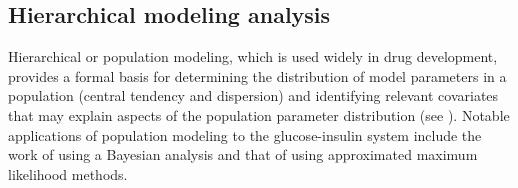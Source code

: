 \documentclass[utf8]{frontiersSCNS} %
\begin{document}
\subsection{Hierarchical modeling analysis}
Hierarchical or population modeling, which is used widely in drug development, provides a formal basis for determining the distribution of model parameters in a population (central tendency and dispersion) and identifying relevant covariates that may explain aspects of the population parameter distribution (see \citet{Bonate2011}). Notable applications of population modeling to the glucose-insulin system include the work of \citet{agbaje_2003} using a Bayesian analysis and that of  \citet{Denti2010} using approximated maximum likelihood methods.
\end{document}
